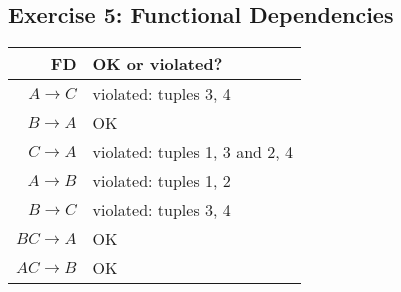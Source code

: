 \subsection{Exercise 5: Functional Dependencies}

\begin{center}
\begin{tabular}{r  l }
  \hline
  FD & OK or violated? \\
   \hline
   $A \rightarrow C$ & violated: tuples 3, 4 \\
   $B \rightarrow A$ & OK \\
   $C \rightarrow A$ & violated: tuples 1, 3 and 2, 4 \\
   $A \rightarrow B$ & violated: tuples 1, 2 \\
   $B \rightarrow C$ & violated: tuples 3, 4 \\
   $BC \rightarrow A$ & OK \\
   $AC \rightarrow B$ & OK \\
   \hline
\end{tabular}
\end{center}
